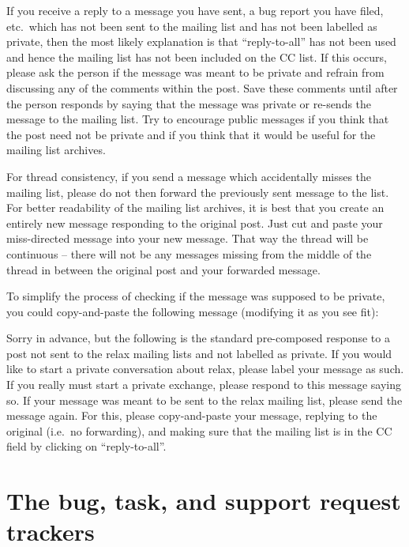 If you receive a reply to a message you have sent, a bug report you have filed, etc.\ which has not been sent to the mailing list and has not been labelled as private, then the most likely explanation is that ``reply-to-all'' has not been used and hence the mailing list has not been included on the CC list.
If this occurs, please ask the person if the message was meant to be private and refrain from discussing any of the comments within the post.
Save these comments until after the person responds by saying that the message was private or re-sends the message to the mailing list.
Try to encourage public messages if you think that the post need not be private and if you think that it would be useful for the mailing list archives.

For thread consistency, if you send a message which accidentally misses the mailing list, please do not then forward the previously sent message to the list.
For better readability of the mailing list archives, it is best that you create an entirely new message responding to the original post.
Just cut and paste your miss-directed message into your new message.
That way the thread will be continuous -- there will not be any messages missing from the middle of the thread in between the original post and your forwarded message.

To simplify the process of checking if the message was supposed to be private, you could copy-and-paste the following message (modifying it as you see fit):

\begin{exampleenv}
Sorry in advance, but the following is the standard pre-composed response to a post not sent to the relax mailing lists and not labelled as private.  If you would like to start a private conversation about relax, please label your message as such.  If you really must start a private exchange, please respond to this message saying so.  If your message was meant to be sent to the relax mailing list, please send the message again.  For this, please copy-and-paste your message, replying to the original (i.e.\ no forwarding), and making sure that the mailing list is in the CC field by clicking on ``reply-to-all''.
\end{exampleenv}





\section{The bug, task, and support request trackers}

